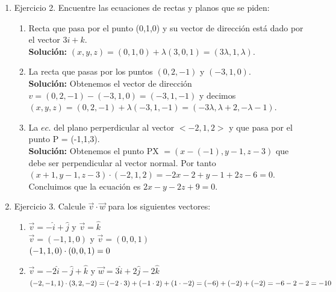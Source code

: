 \documentclass[10pt,letterpaper,fleqn]{article}
\begin{document}
\begin{enumerate}
        \item Ejercicio 2. Encuentre las ecuaciones de rectas y planos que se piden:
        \begin{enumerate}

          \item Recta que pasa por el punto (0,1,0) y su vector de dirección está dado por el vector $3i+k$.\\
          \textbf{Solución:} $(x,y,z) = (0,1,0) + \lambda(3,0,1)=(3\lambda,1,\lambda)$.

          \item La recta que pasas por los puntos $(0,2,-1)$ y $(-3,1,0)$.\\
          \textbf{Solución:} Obtenemos el vector de dirección $v=(0,2,-1) - (-3,1,0) = (-3,1,-1)$ y decimos $(x,y,z)=(0,2,-1) + \lambda(-3,1,-1) = (-3\lambda,\lambda + 2, -\lambda-1)$.
          
                    \item La $ec.$ del plano perperdicular al vector $<-2,1,2>$ y que pasa por el punto P = (-1,1,3).\\
                    \textbf{Solución:} Obtenemos el punto PX $= (x-(-1),y-1,z-3)$ que debe ser perpendicular al vector normal. Por tanto $(x+1  ,y-1,z-3)\cdot(-2,1,2)=-2x-2 + y-1 + 2z - 6 = 0$. Concluimos que la ecuación es $2x-y-2z+9 = 0$.

        \end{enumerate}

        \item Ejercicio 3. Calcule $\overrightarrow{v} \cdot \overrightarrow{w}$
        para los siguientes vectores:
        \begin{enumerate}
          \item
          $\overrightarrow{v} = -\widehat{i}+\widehat{j}$ y
          $\overrightarrow{v} = \widehat{k}$ \\
            $\overrightarrow{v} = (-1,1,0)$ y
            $\overrightarrow{v} = (0,0,1)$ \\
            $
              (-1,1,0) \cdot (0,0,1) \\
              = 0
            $
            \\
          \item
          $\overrightarrow{v} = -2\widehat{i} -\widehat{j} + \widehat{k}$ y
          $\overrightarrow{w} = 3\widehat{i} + 2\widehat{j} -2\widehat{k}$
            $
              (-2,-1,1) \cdot (3,2,-2) \\
              = (-2\cdot 3) + (-1\cdot 2) + (1\cdot -2) \\
              = (-6) + (-2) + (-2) \\
              = - 6 - 2 - 2 \\
              = -10
            $
        \end{enumerate}


\end{enumerate}
\end{document}
